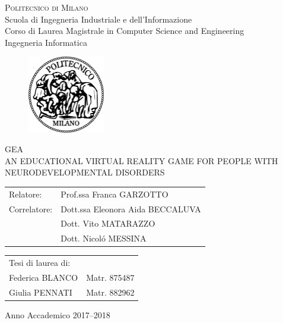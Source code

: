 \begin{titlepage}

\begin{center}
\Large{\textsc{Politecnico di Milano}}\\
\Large{Scuola di Ingegneria Industriale e dell'Informazione}\\
\large{Corso di Laurea Magistrale in Computer Science and Engineering}\\
\large{Ingegneria Informatica}
\par\end{center}

\vspace{0.5cm}

\begin{center}
\begin{figure}[h]
\centering{}\includegraphics[width=0.3\textwidth]{title-page/logo-polimi}
\end{figure}
\vspace{1cm}
\par\end{center}

\begin{center}
\LARGE{GEA\\
AN EDUCATIONAL VIRTUAL REALITY GAME
FOR PEOPLE WITH NEURODEVELOPMENTAL DISORDERS}\vspace{1cm}
\par\end{center}

\begin{flushleft}
\begin{tabular}{ll}
Relatore:  & Prof.ssa Franca GARZOTTO\tabularnewline
Correlatore:  & Dott.ssa Eleonora Aida BECCALUVA\tabularnewline
              & Dott. Vito MATARAZZO\tabularnewline
              & Dott. Nicol\'o MESSINA\tabularnewline
\end{tabular}\vspace{1cm}
\par\end{flushleft}

\begin{flushright}
\begin{tabular}{ll}
Tesi di laurea di: & \tabularnewline
Federica BLANCO & Matr. 875487\tabularnewline
Giulia PENNATI & Matr. 882962\tabularnewline
\end{tabular}\vspace{2cm}
\par\end{flushright}

\begin{center}
{\large{}Anno Accademico 2017--2018}{\large\par}
\par\end{center}

\end{titlepage}
